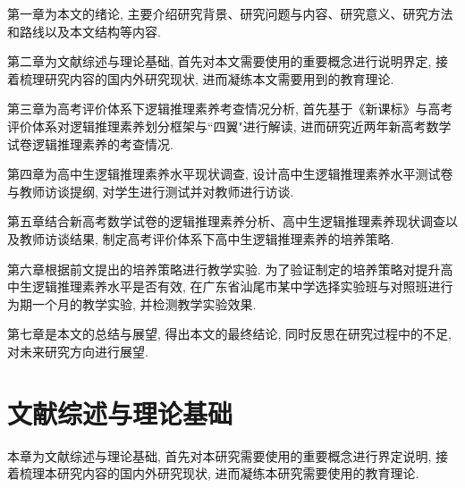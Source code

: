 \documentclass[acaddeg]{Style/SCNUThesisV3}
\begin{document}
第一章为本文的绪论, 主要介绍研究背景、研究问题与内容、研究意义、研究方法和路线以及本文结构等内容. 

第二章为文献综述与理论基础, 首先对本文需要使用的重要概念进行说明界定, 接着梳理研究内容的国内外研究现状, 进而凝练本文需要用到的教育理论. 

第三章为高考评价体系下逻辑推理素养考查情况分析, 首先基于《新课标》与高考评价体系对逻辑推理素养划分框架与``四翼"进行解读, 进而研究近两年新高考数学试卷逻辑推理素养的考查情况. 

第四章为高中生逻辑推理素养水平现状调查, 设计高中生逻辑推理素养水平测试卷与教师访谈提纲, 对学生进行测试并对教师进行访谈.

第五章结合新高考数学试卷的逻辑推理素养分析、高中生逻辑推理素养现状调查以及教师访谈结果, 制定高考评价体系下高中生逻辑推理素养的培养策略. 

第六章根据前文提出的培养策略进行教学实验. 为了验证制定的培养策略对提升高中生逻辑推理素养水平是否有效, 在广东省汕尾市某中学选择实验班与对照班进行为期一个月的教学实验, 并检测教学实验效果. 

第七章是本文的总结与展望, 得出本文的最终结论, 同时反思在研究过程中的不足, 对未来研究方向进行展望. 




\newpage
\vspace*{\fill} %
\mbox{} %
\vspace*{\fill} %
\newpage

\chapter{文献综述与理论基础}\label{Cha: 2}
\setcounter{equation}{0}
本章为文献综述与理论基础, 首先对本研究需要使用的重要概念进行界定说明, 接着梳理本研究内容的国内外研究现状, 进而凝练本研究需要使用的教育理论.

\end{document}
